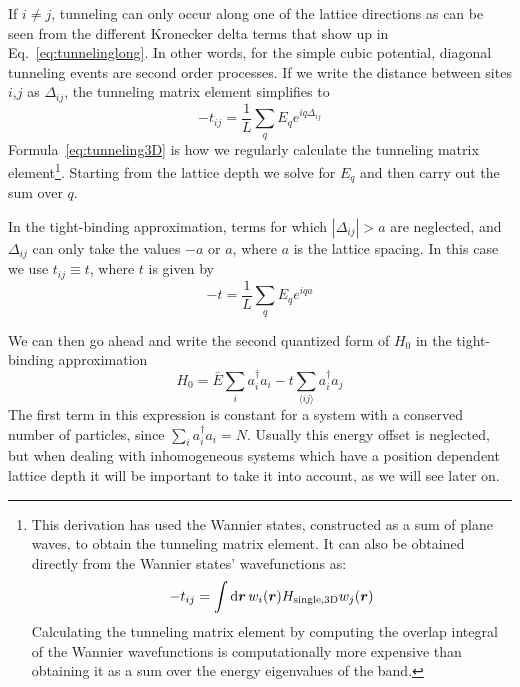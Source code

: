 If $i\neq j$,  tunneling can only occur along one of the lattice directions as
can be seen from the different Kronecker delta terms that show up in
Eq.~\ref{eq:tunnelinglong}.   In other words, for the simple cubic potential,
diagonal tunneling events are second order processes.  If we write the distance
between sites $i$,$j$ as $\Delta_{ij}$, the tunneling matrix element simplifies
to  
\begin{equation}
  -t_{ij} = \frac{1}{L} \sum_{q} E_{q} e^{iq \Delta_{ij}} 
\label{eq:tunneling3D}
\end{equation}
Formula~\ref{eq:tunneling3D} is how we regularly calculate the tunneling matrix
element\footnote{This derivation has used the Wannier states,
constructed as a sum of plane waves, to obtain the tunneling matrix element.
It can also be obtained directly from the Wannier states'  wavefunctions as:
\begin{equation}
  -t_{ij} = \int \mathrm{d}\bm{r} \, w_{i}(\bm{r}) H_{\text{single,3D}} w_{j}(\bm{r}) 
\end{equation}
Calculating the tunneling matrix element by computing the overlap integral of
the Wannier wavefunctions is computationally more expensive than obtaining it
as a sum over the energy eigenvalues of the band. }. Starting from the lattice
depth we solve for $E_{q}$ and then carry out the sum over $q$.


In the tight-binding approximation, terms for which $|\Delta_{ij}|>a$ are
neglected, and  $\Delta_{ij}$ can only take the values $-a$ or $a$,
where $a$ is the lattice spacing.  In this case we use $t_{ij}\equiv t$, where
$t$ is given by
\begin{equation}
  -t = \frac{1}{L} \sum_{q} E_{q} e^{iqa} 
\label{eq:tunneling3D_tight}
\end{equation}

We can then go ahead and write the second quantized form of $H_{0}$ in the
tight-binding approximation 
\begin{equation}
  \label{eq:hubbard_not_shifted} 
  H_{0}  =  \bar{E} \sum_{i}  a_{i}^{\dagger} a_{i}  - t 
    \sum_{ \langle i j \rangle }
                      a_{i}^{\dagger} a_{j}   
\end{equation} 
The first term in this expression is constant for a system with a conserved
number of particles, since $\sum_{i}  a_{i}^{\dagger} a_{i}=N$.    Usually this
energy offset is neglected, but when dealing with inhomogeneous systems which
have a position dependent lattice depth it will be important to take it into
account, as we will see later on.   



